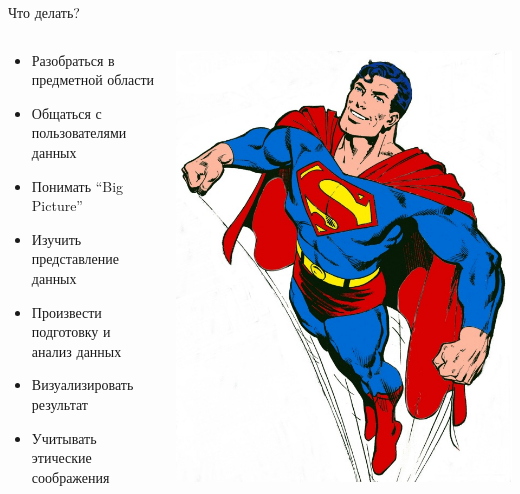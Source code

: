 \documentclass[10pt,a4paper]{beamer}
\begin{document}
\begin{frame}{Что делать?}

\begin{columns}[T]
    \begin{column}{.6\textwidth}
     \begin{block}{}
     	\begin{footnotesize}
		\begin{itemize}
		\item Разобраться в предметной области
		\item Общаться с пользователями данных
		\item Понимать ``Big Picture''
		\item Изучить представление данных
		\item Произвести подготовку и анализ данных
		\item Визуализировать результат
		\item Учитывать этические соображения
		\end{itemize}
     	\end{footnotesize}
    \end{block}
    \end{column}
    \begin{column}{.4\textwidth}
    \begin{block}{}
    \vspace{-3em}
	\begin{center}
   		\includegraphics[scale=0.7]{images/superman.jpg}
    \end{center}
    \end{block}
    \end{column}
  \end{columns}


\end{frame}
\end{document}
